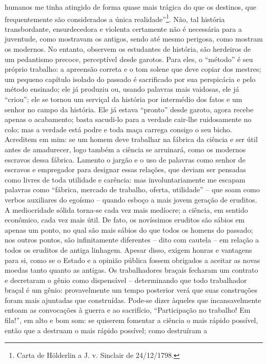 humanos me tinha atingido de forma quase mais trágica do que os
destinos, que frequentemente são considerados a única
realidade''\footnote{Carta de Hölderlin a J. v. Sinclair de 24/12/1798.}.
Não, tal história transbordante, ensurdecedora e violenta certamente não
é necessária para a juventude, como mostravam os antigos, sendo até
mesmo perigosa, como mostram os modernos. No entanto, observem os
estudantes de história, são herdeiros de um pedantismo precoce,
perceptível desde garotos. Para eles, o ``método'' é seu próprio
trabalho: a apreensão correta e o tom solene que deve copiar dos
mestres; um pequeno capítulo isolado do passado é sacrificado por sua
perspicácia e pelo método ensinado; ele já produziu ou, usando palavras
mais vaidosas, ele já ``criou''; ele se tornou um serviçal da história
por intermédio dos fatos e um senhor no campo da história. Ele já estava
``pronto'' desde garoto, agora recebe apenas o acabamento; basta
sacudi-lo para a verdade cair-lhe ruidosamente no colo; mas a verdade
está podre e toda maça carrega consigo o seu bicho. Acreditem em mim: se
um homem deve trabalhar na fábrica da ciência e ser útil antes de
amadurecer, logo também a ciência se arruinará, como os modernos
escravos dessa fábrica. Lamento o jargão e o uso de palavras como senhor
de escravos e empregador para designar essas relações, que deviam ser
pensadas como livres de toda utilidade e carência: mas involuntariamente
me escapam palavras como ``fábrica, mercado de trabalho, oferta,
utilidade'' -- que soam como verbos auxiliares do egoísmo -- quando
esboço a mais jovem geração de eruditos. A mediocridade sólida torna-se
cada vez mais medíocre; a ciência, em sentido econômico, cada vez mais
útil. De fato, os novíssimos eruditos são sábios em apenas um ponto, no
qual são mais sábios do que todos os homens do passado; nos outros
pontos, são infinitamente diferentes -- dito com cautela -- em relação a
todos os eruditos de antiga linhagem. Apesar disso, exigem honras e
vantagens para si, como se o Estado e a opinião pública fossem obrigados
a aceitar as novas moedas tanto quanto as antigas. Os trabalhadores
braçais fecharam um contrato e decretaram o gênio como dispensável --
determinando que todo trabalhador braçal é um gênio: provavelmente um
tempo posterior verá que suas construções foram mais ajuntadas que
construídas. Pode-se dizer àqueles que incansavelmente entoam as
convocações à guerra e ao sacrifício, ``Participação no trabalho! Em
fila!'', em alto e bom som: se quiserem fomentar a ciência o mais rápido
possível, então que a destruam o mais rápido possível; como destruíram a
